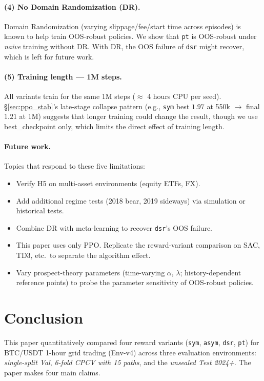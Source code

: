 \documentclass[11pt, a4paper]{article}
\begin{document}
\paragraph{(4) No Domain Randomization (DR).}
Domain Randomization (varying slippage/fee/start time across episodes) is
known to help train OOS-robust policies. We show that \texttt{pt} is
OOS-robust under \emph{naive} training without DR. With DR, the OOS failure
of \texttt{dsr} might recover, which is left for future work.

\paragraph{(5) Training length --- 1M steps.}
All variants train for the same 1M steps ($\approx$ 4 hours CPU per seed).
\S\ref{sec:ppo_stab}'s late-stage collapse pattern (e.g., \texttt{sym} best
$1.97$ at 550k $\to$ final $1.21$ at 1M) suggests that longer training could
change the result, though we use best\_checkpoint only, which limits the
direct effect of training length.

\paragraph{Future work.}
Topics that respond to these five limitations:
\begin{itemize}[leftmargin=*]
\item Verify H5 on multi-asset environments (equity ETFs, FX).
\item Add additional regime tests (2018 bear, 2019 sideways) via simulation or
historical tests.
\item Combine DR with meta-learning to recover \texttt{dsr}'s OOS failure.
\item This paper uses only PPO. Replicate the reward-variant comparison
on SAC, TD3, etc.\ to separate the algorithm effect.
\item Vary prospect-theory parameters (time-varying $\alpha$, $\lambda$;
history-dependent reference points) to probe the parameter sensitivity of
OOS-robust policies.
\end{itemize}

\section{Conclusion}
\label{sec:conclusion}

This paper quantitatively compared four reward variants
(\texttt{sym}, \texttt{asym}, \texttt{dsr}, \texttt{pt}) for BTC/USDT 1-hour
grid trading (Env-v4) across three evaluation environments: \emph{single-split
Val}, \emph{6-fold CPCV with 15 paths}, and the \emph{unsealed Test 2024+}.
The paper makes four main claims.
\end{document}
